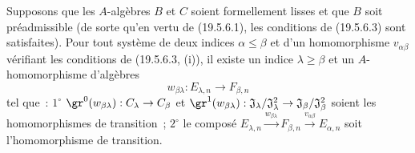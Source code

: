 \begin{lemma}[19.5.6.5]
\label{0.19.5.6.5-fr}
Supposons que les $A$-algèbres $B$ et $C$ soient formellement lisses et que
$B$ soit préadmissible (de sorte qu'en vertu de (19.5.6.1), les conditions de
(19.5.6.3) sont satisfaites). Pour tout système de deux indices
$\alpha\leq\beta$ et d'un homomorphisme $v_{\alpha\beta}$ vérifiant les
conditions de (19.5.6.3, (i)), il existe un indice $\lambda\geq\beta$ et un
$A$-homomorphisme d'algèbres
\[
  w_{\beta\lambda}:E_{\lambda,n}\longrightarrow F_{\beta,n}
\]
tel que~: $1^\circ$ $\gr^0(w_{\beta\lambda}):C_\lambda\to C_\beta$ et
$\gr^1(w_{\beta\lambda}):
\mathfrak J_\lambda/\mathfrak J_\lambda^2\to
\mathfrak J_\beta/\mathfrak J_\beta^2$ soient les homomorphismes de
transition~; $2^\circ$ le composé
$E_{\lambda,n}\xrightarrow{w_{\beta\lambda}}F_{\beta,n}
\xrightarrow{v_{\alpha\beta}}E_{\alpha,n}$ soit l'homomorphisme de transition.
\end{lemma}

